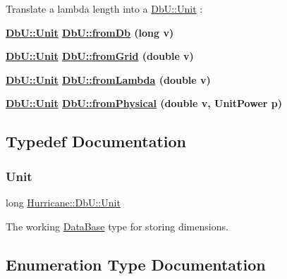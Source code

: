 Translate a lambda length into a \hyperlink{group__DbUGroup_ga4fbfa3e8c89347af76c9628ea06c4146}{Db\+U\+::\+Unit} \+: 
\begin{DoxyItemize}
\item {\bfseries \hyperlink{group__DbUGroup_ga4fbfa3e8c89347af76c9628ea06c4146}{Db\+U\+::\+Unit} \hyperlink{group__DbUGroup_gaec69d65ec1651c2feea24c5931f4580b}{Db\+U\+::from\+Db} (long v)} 
\item {\bfseries \hyperlink{group__DbUGroup_ga4fbfa3e8c89347af76c9628ea06c4146}{Db\+U\+::\+Unit} \hyperlink{group__DbUGroup_ga367e1d1b5ac1df076745550cba8a83c1}{Db\+U\+::from\+Grid} (double v)} 
\item {\bfseries \hyperlink{group__DbUGroup_ga4fbfa3e8c89347af76c9628ea06c4146}{Db\+U\+::\+Unit} \hyperlink{group__DbUGroup_ga4b570755b19ea9ff0f2f258a221bd935}{Db\+U\+::from\+Lambda} (double v)} 
\item {\bfseries \hyperlink{group__DbUGroup_ga4fbfa3e8c89347af76c9628ea06c4146}{Db\+U\+::\+Unit} \hyperlink{group__DbUGroup_ga11d4dbd9134a19bda35cbacde1cb2769}{Db\+U\+::from\+Physical} (double v, Unit\+Power p)} 
\end{DoxyItemize}

\subsection{Typedef Documentation}
\mbox{\label{group__DbUGroup_ga4fbfa3e8c89347af76c9628ea06c4146}} 
\subsubsection{\texorpdfstring{Unit}{Unit}}
{\footnotesize\ttfamily long \hyperlink{group__DbUGroup_ga4fbfa3e8c89347af76c9628ea06c4146}{Hurricane\+::\+Db\+U\+::\+Unit}}

The working \hyperlink{classHurricane_1_1DataBase}{Data\+Base} type for storing dimensions. 

\subsection{Enumeration Type Documentation}
\mbox{\label{group__DbUGroup_ga6af6a5b8d113a661fea65b2bcb8b25c4}} 
